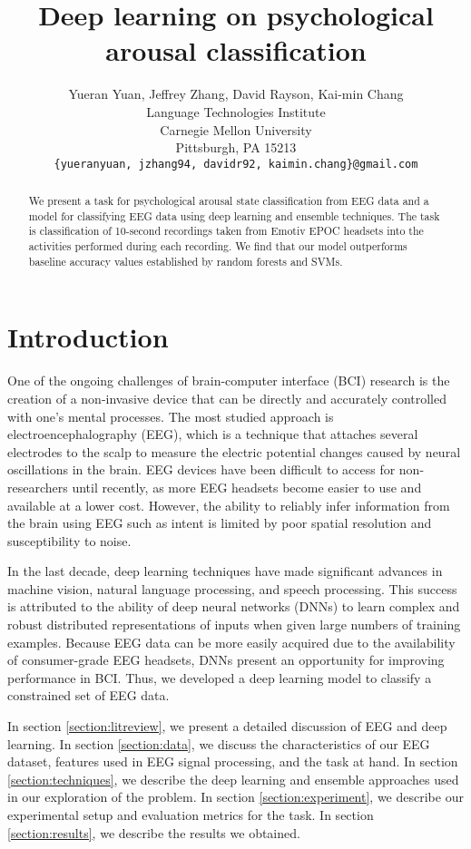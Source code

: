 \documentclass{article} %
\title{Deep learning on psychological arousal classification}
\author{
Yueran Yuan, Jeffrey Zhang, David Rayson, Kai-min Chang\\
Language Technologies Institute\\
Carnegie Mellon University\\
Pittsburgh, PA 15213\\
\texttt{\{yueranyuan, jzhang94, davidr92, kaimin.chang\}@gmail.com}
}
\begin{document}
\maketitle

\begin{abstract}
We present a task for psychological arousal state classification from EEG data and a model for classifying EEG data using deep learning and ensemble techniques. The task is classification of 10-second recordings taken from Emotiv EPOC headsets into the activities performed during each recording. We find that our model outperforms baseline accuracy values established by random forests and SVMs.
\end{abstract}

\section{Introduction} \label{section:introduction}
One of the ongoing challenges of brain-computer interface (BCI) research is the creation of a non-invasive device that can be directly and accurately controlled with one's mental processes. The most studied approach is electroencephalography (EEG), which is a technique that attaches several electrodes to the scalp to measure the electric potential changes caused by neural oscillations in the brain. EEG devices have been difficult to access for non-researchers until recently, as more EEG headsets become easier to use and available at a lower cost. However, the ability to reliably infer information from the brain using EEG such as intent is limited by poor spatial resolution and susceptibility to noise.

In the last decade, deep learning techniques have made significant advances in machine vision, natural language processing, and speech processing. This success is attributed to the ability of deep neural networks (DNNs) to learn complex and robust distributed representations of inputs \cite{DBLP:journals/corr/abs-1206-5538} when given large numbers of training examples. Because EEG data can be more easily acquired due to the availability of consumer-grade EEG headsets, DNNs present an opportunity for improving performance in BCI. Thus, we developed a deep learning model to classify a constrained set of EEG data.

In section \ref{section:litreview}, we present a detailed discussion of EEG and deep learning. In section \ref{section:data}, we discuss the characteristics of our EEG dataset, features used in EEG signal processing, and the task at hand. In section \ref{section:techniques}, we describe the deep learning and ensemble approaches used in our exploration of the problem. In section \ref{section:experiment}, we describe our experimental setup and evaluation metrics for the task. In section \ref{section:results}, we describe the results we obtained.
\end{document}
